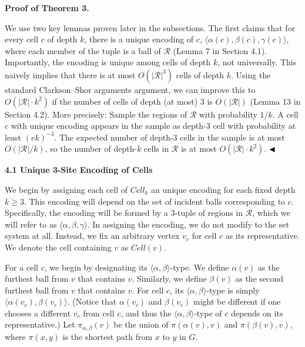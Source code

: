 \documentclass[10pt,a4paper]{article}
\begin{document}
\par\medskip\noindent\textbf{Proof of Theorem 3.}\par
We use two key lemmas proven later in the subsections. The first claims that for every cell $c$ of depth $k$, there is a unique encoding of $c$, $\langle\alpha(c),\beta(c),\gamma(c)\rangle$, where each member of the tuple is a ball of $\mathcal{R}$ (Lemma 7 in Section 4.1). Importantly, the encoding is unique among cells of depth $k$, not universally. This naively implies that there is at most $O(|\mathcal{R}|^{3})$ cells of depth $k$. Using the standard Clarkson–Shor arguments argument, we can improve this to $O(|\mathcal{R}|\cdot k^{2})$ if the number of cells of depth (at most) $3$ is $O(|\mathcal{R}|)$ (Lemma 13 in Section 4.2). More precisely: Sample the regions of $\mathcal{R}$ with probability $1/k$. A cell $c$ with unique encoding appears in the sample as depth-3 cell with probability at least $(ek)^{-3}$. The expected number of depth-3 cells in the sample is at most $O(|\mathcal{R}|/k)$, so the number of depth-$k$ cells in $\mathcal{R}$ is at most $O(|\mathcal{R}|\cdot k^{2})$. $\hfill\blacktriangleleft$
\par
\par
\par\medskip\noindent\textbf{4.1 Unique 3-Site Encoding of Cells}\par
We begin by assigning each cell of $\mathit{Cell}_{k}$ an unique encoding for each fixed depth $k\geq 3$. This encoding will depend on the set of incident balls corresponding to $c$. Specifically, the encoding will be formed by a 3-tuple of regions in $\mathcal{R}$, which we will refer to as $\langle\alpha,\beta,\gamma\rangle$. In assigning the encoding, we do not modify to the set system at all. Instead, we fix an arbitrary vertex $v_{c}$ for cell $c$ as its representative. We denote the cell containing $v$ as $\mathit{Cell}(v)$.
\par
\par
For a cell $c$, we begin by designating its $\langle\alpha,\beta\rangle$-type. We define $\alpha(v)$ as the furthest ball from $v$ that contains $v$. Similarly, we define $\beta(v)$ as the second furthest ball from $v$ that contains $v$. For cell $c$, its $\langle\alpha,\beta\rangle$-type is simply $\langle\alpha(v_{c}),\beta(v_{c})\rangle$. (Notice that $\alpha(v_{c})$ and $\beta(v_{c})$ might be different if one chooses a different $v_{c}$ from cell $c$, and thus the $\langle\alpha,\beta\rangle$-type of $c$ depends on its representative.) Let $\pi_{\alpha,\beta}(v)$ be the union of $\pi(\alpha(v),v)$ and $\pi(\beta(v),v)$, where $\pi(x,y)$ is the shortest path from $x$ to $y$ in $G$.
\end{document}
